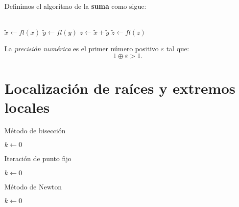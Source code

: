 \documentclass[8pt,a4paper]{extarticle}
\begin{document}
\begin{multicols}{3}
\begin{boxdef}
	Definimos el algoritmo de la \textbf{suma} como sigue:
	\\
	\\
	\begin{algorithm}[H]
		$\tilde{x} \longleftarrow fl(x)$\;
		$\tilde{y} \longleftarrow fl(y)$\;
		$z \longleftarrow \tilde{x} + \tilde{y}$\;
		$\tilde{z} \longleftarrow fl(z)$
	\end{algorithm}
\end{boxdef}

\begin{boxdef}
	La \emph{precisión numérica} es el primer número positivo $\varepsilon$ tal que:
	\[
	1 \oplus \varepsilon > 1
	.\] 
\end{boxdef}

\newpage

\section{Localización de raíces y extremos locales}

\begin{algorithm}[H]
	\caption{Método de bisección}
	$k \longleftarrow 0$\;
\end{algorithm}

\vspace{1cm}

\begin{algorithm}[H]
	\caption{Iteración de punto fijo}
	$k \longleftarrow 0$\;
\end{algorithm}

\sectionbreak

\begin{algorithm}[H]
	\caption{Método de Newton}
	$k \longleftarrow 0$\;
\end{algorithm}


\end{multicols}
\end{document}
